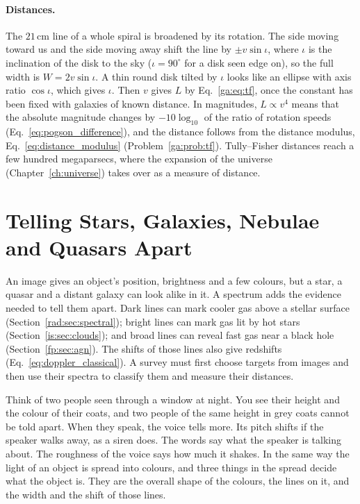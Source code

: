 \paragraph{Distances.} The $21\,\mathrm{cm}$ line of a whole spiral is broadened by its rotation. The side moving toward us and the side moving away shift the line by $\pm v\sin\iota$, where $\iota$ is the inclination of the disk to the sky ($\iota=90^\circ$ for a disk seen edge on), so the full width is $W=2v\sin\iota$. A thin round disk tilted by $\iota$ looks like an ellipse with axis ratio $\cos\iota$, which gives $\iota$. Then $v$ gives $L$ by Eq.~\eqref{ga:eq:tf}, once the constant has been fixed with galaxies of known distance. In magnitudes, $L\propto v^4$ means that the absolute magnitude changes by $-10\log_{10}$ of the ratio of rotation speeds (Eq.~\eqref{eq:pogson_difference}), and the distance follows from the distance modulus, Eq.~\eqref{eq:distance_modulus} (Problem~\ref{ga:prob:tf}). Tully–Fisher distances reach a few hundred megaparsecs, where the expansion of the universe (Chapter~\ref{ch:universe}) takes over as a measure of distance.
\section{Telling Stars, Galaxies, Nebulae and Quasars Apart}
\label{ga:sec:spectra}

An image gives an object's position, brightness and a few colours, but a star, a quasar and a distant galaxy can look alike in it. A spectrum adds the evidence needed to tell them apart. Dark lines can mark cooler gas above a stellar surface (Section~\ref{rad:sec:spectral}); bright lines can mark gas lit by hot stars (Section~\ref{is:sec:clouds}); and broad lines can reveal fast gas near a black hole (Section~\ref{fp:sec:agn}). The shifts of those lines also give redshifts (Eq.~\eqref{eq:doppler_classical}). A survey must first choose targets from images and then use their spectra to classify them and measure their distances.

Think of two people seen through a window at night. You see their height and the colour of their coats, and two people of the same height in grey coats cannot be told apart. When they speak, the voice tells more. Its pitch shifts if the speaker walks away, as a siren does. The words say what the speaker is talking about. The roughness of the voice says how much it shakes. In the same way the light of an object is spread into colours, and three things in the spread decide what the object is. They are the overall shape of the colours, the lines on it, and the width and the shift of those lines.

